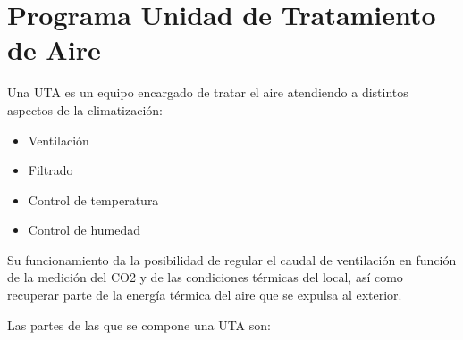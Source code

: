 
\cleardoublepage
\chapter{Programa Unidad de Tratamiento de Aire}

\label{chap:anexoProgramaUTA} %

Una UTA es un equipo encargado de tratar el aire atendiendo a distintos aspectos de la climatización:

\begin{itemize}
    \item Ventilación
    \item Filtrado
    \item Control de temperatura
    \item Control de humedad
\end{itemize}

Su funcionamiento da la posibilidad de regular el caudal de ventilación en función de la medición del CO2 y de las condiciones térmicas del local, así como recuperar parte de la energía térmica del aire que se expulsa al exterior.

Las partes de las que se compone una UTA son:


